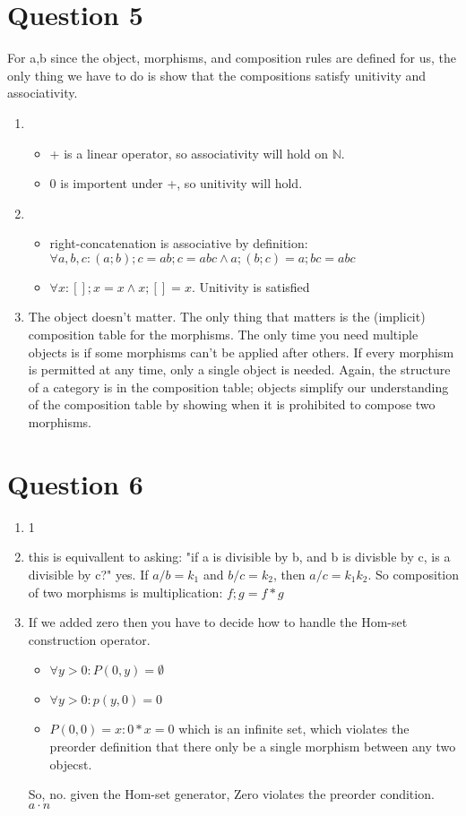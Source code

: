 \documentclass{article}
\begin{document}
\section*{Question 5}
For a,b since the object, morphisms, and composition rules are defined for us, the only thing we have to do is show that the compositions satisfy unitivity and associativity.
\begin{enumerate}[a]
    \item
        \begin{itemize}
            \item + is a linear operator, so associativity will hold on $\mathbb{N}$.
            \item 0 is importent under +, so unitivity will hold.
        \end{itemize}
    \item
        \begin{itemize}
            \item right-concatenation is associative by definition: $\forall a,b,c: (a;b);c = ab;c = abc \land a;(b;c) = a;bc = abc$
            \item $\forall x: [];x = x \land x;[] = x$. Unitivity is satisfied
        \end{itemize}
    \item The object doesn't matter. The only thing that matters is the (implicit) composition table for the morphisms. The only time you need multiple objects is if some morphisms can't be applied after others. If every morphism is permitted at any time, only a single object is needed. Again, the structure of a category is in the composition table; objects simplify our understanding of the composition table by showing when it is prohibited to compose two morphisms.

\end{enumerate}
\section*{Question 6}
\begin{enumerate}[a]
    \item 1
    \item this is equivallent to asking: "if a is divisible by b, and b is divisble by c, is a divisible by c?" yes. If $a/b=k_1$ and $b/c=k_2$, then $a/c=k_1k_2$. So composition of two morphisms is multiplication: $f;g = f*g$
    \item If we added zero then you have to decide how to handle the Hom-set construction operator.
    \begin{itemize}
        \item $\forall y>0: P(0, y) = \emptyset$
        \item $\forall y>0: p(y, 0) = {0}$
        \item $P(0,0) = {x: 0*x = 0}$ which is an infinite set, which violates the preorder definition that there only be a single morphism between any two objecst.
    \end{itemize}
    So, no. given the Hom-set generator, Zero violates the preorder condition.
    $a \cdot n $
\end{enumerate}
\end{document}
